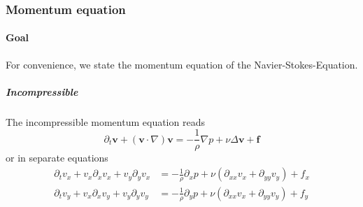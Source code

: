 \documentclass{article}
\begin{document}
\subsubsection{Momentum equation}
\label{subs:Momentum equation}
\paragraph{Goal}
\label{par:Goal}
For convenience, we state the momentum equation of the Navier-Stokes-Equation.

\subparagraph{Incompressible}
\label{subp:Incompressible}
The incompressible momentum equation reads
\begin{equation}
  \partial_t \mathbf{v} + \left(\mathbf{v}\cdot\nabla\right)\mathbf{v} = - \frac{1}{\rho}\nabla p + \nu \Delta \mathbf{v} + \mathbf{f}
\end{equation}
or in separate equations
\begin{equation}
  \begin{aligned}
    \partial_t v_x + v_x \partial_x v_x + v_y \partial_y v_x
    &= -  \frac{1}{\rho}\partial_x p + \nu (\partial_{xx} v_x + \partial_{yy} v_y) + f_x \\
    \partial_t v_y + v_x \partial_x v_y + v_y \partial_y v_y
    &= -  \frac{1}{\rho}\partial_y p + \nu (\partial_{xx} v_x + \partial_{yy} v_y) + f_y
  \end{aligned}
\end{equation}
\end{document}
